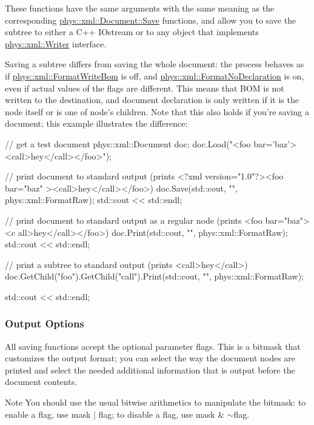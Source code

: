  These functions have the same arguments with the same meaning as the corresponding \hyperlink{classphys_1_1xml_1_1Document_a6aacc12d692e13976c568ed50186b85d}{phys::xml::Document::Save} functions, and allow you to save the subtree to either a C++ IOstream or to any object that implements \hyperlink{classphys_1_1xml_1_1Writer}{phys::xml::Writer} interface. \par
 \par
 Saving a subtree differs from saving the whole document: the process behaves as if \hyperlink{namespacephys_1_1xml_a76a253f60deb94ef39c255064afb6040}{phys::xml::FormatWriteBom} is off, and \hyperlink{namespacephys_1_1xml_aee4ccb3535945d4808a0cf6abe4cb050}{phys::xml::FormatNoDeclaration} is on, even if actual values of the flags are different. This means that BOM is not written to the destination, and document declaration is only written if it is the node itself or is one of node's children. Note that this also holds if you're saving a document; this example illustrates the difference: 
\begin{DoxyCode}
 // get a test document
 phys::xml::Document doc;
 doc.Load("<foo bar='baz'><call>hey</call></foo>");

 // print document to standard output (prints <?xml version="1.0"?><foo bar="baz"
      ><call>hey</call></foo>)
 doc.Save(std::cout, "", phys::xml::FormatRaw);
 std::cout << std::endl;

 // print document to standard output as a regular node (prints <foo bar="baz"><c
      all>hey</call></foo>)
 doc.Print(std::cout, "", phys::xml::FormatRaw);
 std::cout << std::endl;

 // print a subtree to standard output (prints <call>hey</call>)
 doc.GetChild("foo").GetChild("call").Print(std::cout, "", phys::xml::FormatRaw);
      
 std::cout << std::endl;
\end{DoxyCode}
 \hypertarget{XMLManual_XMLSavingOptions}{}\subsubsection{Output Options}\label{XMLManual_XMLSavingOptions}
All saving functions accept the optional parameter flags. This is a bitmask that customizes the output format; you can select the way the document nodes are printed and select the needed additional information that is output before the document contents. \begin{DoxyNote}{Note}
You should use the usual bitwise arithmetics to manipulate the bitmask: to enable a flag, use mask $|$ flag; to disable a flag, use mask \& $\sim$flag.
\end{DoxyNote}
